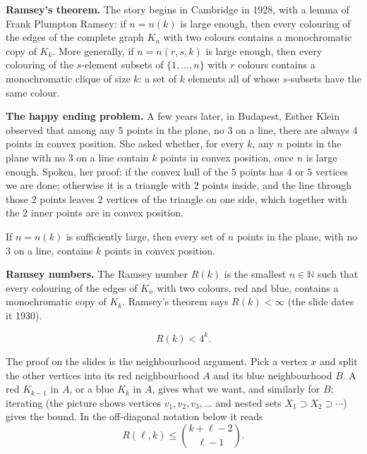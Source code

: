 \medskip\noindent
{\bf Ramsey's theorem.} The story begins in
Cambridge in 1928, with a lemma of Frank
Plumpton Ramsey: if $n = n(k)$ is large
enough, then every colouring of the edges of
the complete graph $K_n$ with two colours
contains a monochromatic copy of $K_k$. More
generally, if $n = n(r,s,k)$ is large enough,
then every colouring of the $s$-element
subsets of $\{1,\ldots,n\}$ with $r$ colours
contains a monochromatic clique of size $k$:
a set of $k$ elements all of whose
$s$-subsets
have the same colour.

\medskip\noindent
{\bf The happy ending problem.} A few years
later, in Budapest, Esther Klein observed
that among any $5$ points in the plane, no
$3$ on a line, there are always $4$ points in
convex position. She asked whether, for every
$k$, any $n$ points in the plane with no $3$
on a line contain $k$ points in convex
position, once $n$ is large enough.
Spoken, her proof: if the convex hull of the
$5$ points has $4$ or $5$ vertices we are
done; otherwise it is a triangle with $2$
points inside, and the line through those
$2$ points leaves $2$ vertices of the
triangle on one side, which together with
the $2$ inner points are in convex
position.

\begin{theorem}
\label{theorem-happy-ending}
If $n = n(k)$ is sufficiently large, then
every set of $n$ points in the plane, with no
$3$ on a line, contains $k$ points in convex
position.
\end{theorem}

\medskip\noindent
{\bf Ramsey numbers.} The Ramsey number
$R(k)$
is the smallest $n \in \mathbb{N}$ such that
every colouring of the edges of $K_n$ with
two colours, red and blue, contains a
monochromatic copy of $K_k$.
Ramsey's theorem says $R(k) < \infty$
(the slide dates it 1930).

\begin{theorem}
\label{theorem-erdos-szekeres-upper}
$$
R(k) < 4^k.
$$
\end{theorem}

\noindent
The proof on the slides is the neighbourhood
argument. Pick a vertex $x$ and split the
other vertices into its red neighbourhood
$A$ and its blue neighbourhood $B$. A red
$K_{k-1}$ in $A$, or a blue $K_k$ in $A$,
gives what we want, and similarly for $B$;
iterating (the picture shows vertices
$v_1, v_2, v_3, \ldots$ and nested sets
$X_1 \supset X_2 \supset \cdots$) gives the
bound. In the off-diagonal notation below it
reads
$$
R(\ell,k)
\le \binom{k+\ell-2}{\ell-1}.
$$

